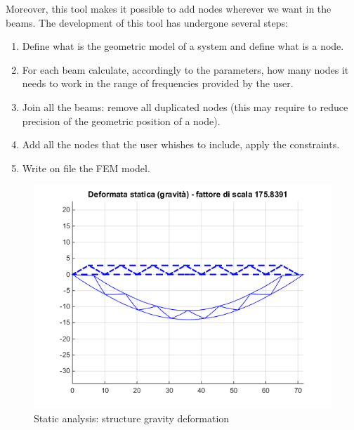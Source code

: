 \documentclass[10pt,a4paper,final]{report}
\begin{document}
Moreover, this tool makes it possible to add nodes wherever we want in the beams.
The development of this tool has undergone several steps:
\begin{enumerate}
\item Define what is the geometric model of a system and define what is a node.
\item For each beam calculate, accordingly to the parameters, how many nodes it needs to work in the range of frequencies provided by the user.
\item Join all the beams: remove all duplicated nodes (this may require to reduce precision of the geometric position of a node).
\item Add all the nodes that the user whishes to include, apply the constraints.
\item Write on file the FEM model.
\end{enumerate}

\begin{figure}
  \begin{center}
    \includegraphics[scale=0.4]{gravity_deformation}
  \end{center}
  \label{fig:gravitydeformation}
  \caption{Static analysis: structure gravity deformation}
\end{figure}
\end{document}
